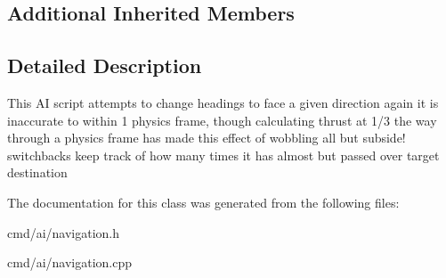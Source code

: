 \subsection*{Additional Inherited Members}


\subsection{Detailed Description}
This AI script attempts to change headings to face a given direction again it is inaccurate to within 1 physics frame, though calculating thrust at 1/3 the way through a physics frame has made this effect of wobbling all but subside! switchbacks keep track of how many times it has almost but passed over target destination 

The documentation for this class was generated from the following files\+:\begin{DoxyCompactItemize}
\item 
cmd/ai/navigation.\+h\item 
cmd/ai/navigation.\+cpp\end{DoxyCompactItemize}
